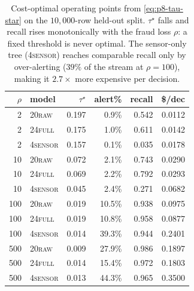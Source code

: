 \documentclass{article}
\begin{document}
\begin{table}[t]
\centering
\small
\caption{Cost-optimal operating points from \eqref{eq:p8-tau-star} on the
$10{,}000$-row held-out split. $\tau^\star$ falls and recall rises
monotonically with the fraud loss $\rho$: a fixed threshold is never
optimal. The sensor-only tree (\textsc{4sensor}) reaches comparable recall
only by over-alerting ($39\%$ of the stream at $\rho{=}100$), making it
$2.7\times$ more expensive per decision.}
\label{tab:p8-cost-optimal}
\begin{tabular}{r l r r r r}
\toprule
$\rho$ & model & $\tau^\star$ & alert\% & recall & \$/dec \\
\midrule
2   & \textsc{20raw}   & 0.197 & 0.9\%  & 0.542 & 0.0112 \\
2   & \textsc{24full}  & 0.175 & 1.0\%  & 0.611 & 0.0142 \\
2   & \textsc{4sensor} & 0.157 & 0.1\%  & 0.035 & 0.0178 \\
\midrule
10  & \textsc{20raw}   & 0.072 & 2.1\%  & 0.743 & 0.0290 \\
10  & \textsc{24full}  & 0.069 & 2.2\%  & 0.792 & 0.0293 \\
10  & \textsc{4sensor} & 0.045 & 2.4\%  & 0.271 & 0.0682 \\
\midrule
100 & \textsc{20raw}   & 0.019 & 10.5\% & 0.938 & 0.0975 \\
100 & \textsc{24full}  & 0.019 & 10.8\% & 0.958 & 0.0877 \\
100 & \textsc{4sensor} & 0.014 & 39.3\% & 0.944 & 0.2401 \\
\midrule
500 & \textsc{20raw}   & 0.009 & 27.9\% & 0.986 & 0.1897 \\
500 & \textsc{24full}  & 0.014 & 15.4\% & 0.972 & 0.1803 \\
500 & \textsc{4sensor} & 0.013 & 44.3\% & 0.965 & 0.3500 \\
\bottomrule
\end{tabular}
\end{table}
\end{document}
